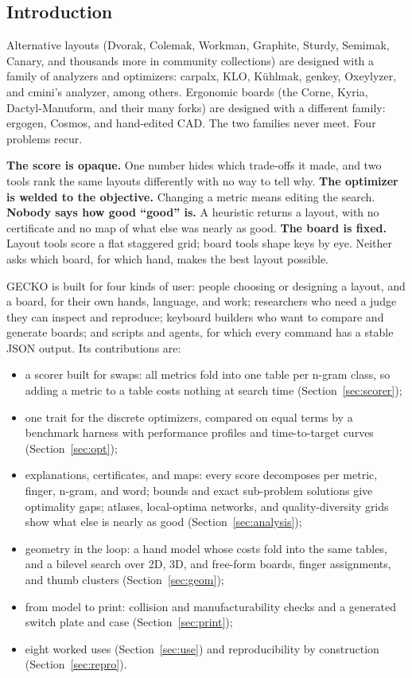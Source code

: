 \documentclass{gecko-paper}
\begin{document}
\begin{paperbody}
\section{Introduction}
Alternative layouts (Dvorak, Colemak, Workman, Graphite, Sturdy, Semimak, Canary, and thousands more in community collections) are designed with a family of analyzers and optimizers: carpalx, KLO, K\"uhlmak, genkey, Oxeylyzer, and cmini's analyzer, among others. Ergonomic boards (the Corne, Kyria, Dactyl-Manuform, and their many forks) are designed with a different family: ergogen, Cosmos, and hand-edited CAD. The two families never meet. Four problems recur.

\textbf{The score is opaque.} One number hides which trade-offs it made, and two tools rank the same layouts differently with no way to tell why. \textbf{The optimizer is welded to the objective.} Changing a metric means editing the search. \textbf{Nobody says how good ``good'' is.} A heuristic returns a layout, with no certificate and no map of what else was nearly as good. \textbf{The board is fixed.} Layout tools score a flat staggered grid; board tools shape keys by eye. Neither asks which board, for which hand, makes the best layout possible.

GECKO is built for four kinds of user: people choosing or designing a layout, and a board, for their own hands, language, and work; researchers who need a judge they can inspect and reproduce; keyboard builders who want to compare and generate boards; and scripts and agents, for which every command has a stable JSON output. Its contributions are:
\begin{itemize}\setlength{\itemsep}{2pt}\setlength{\parskip}{0pt}
\item a scorer built for swaps: all metrics fold into one table per n-gram class, so adding a metric to a table costs nothing at search time (Section~\ref{sec:scorer});
\item one trait for the discrete optimizers, compared on equal terms by a benchmark harness with performance profiles and time-to-target curves (Section~\ref{sec:opt});
\item explanations, certificates, and maps: every score decomposes per metric, finger, n-gram, and word; bounds and exact sub-problem solutions give optimality gaps; atlases, local-optima networks, and quality-diversity grids show what else is nearly as good (Section~\ref{sec:analysis});
\item geometry in the loop: a hand model whose costs fold into the same tables, and a bilevel search over 2D, 3D, and free-form boards, finger assignments, and thumb clusters (Section~\ref{sec:geom});
\item from model to print: collision and manufacturability checks and a generated switch plate and case (Section~\ref{sec:print});
\item eight worked uses (Section~\ref{sec:use}) and reproducibility by construction (Section~\ref{sec:repro}).
\end{itemize}


\end{paperbody}
\end{document}
